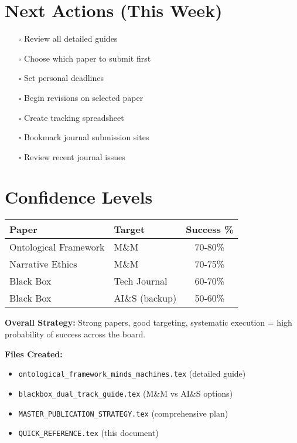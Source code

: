 \documentclass[12pt]{article}
\begin{document}
\section*{Next Actions (This Week)}

\begin{enumerate}[itemsep=0pt]
\item[$\square$] Review all detailed guides
\item[$\square$] Choose which paper to submit first
\item[$\square$] Set personal deadlines
\item[$\square$] Begin revisions on selected paper
\item[$\square$] Create tracking spreadsheet
\item[$\square$] Bookmark journal submission sites
\item[$\square$] Review recent journal issues
\end{enumerate}

\section*{Confidence Levels}

\begin{center}
\begin{tabular}{|l|l|c|}
\hline
\textbf{Paper} & \textbf{Target} & \textbf{Success \%} \\
\hline
Ontological Framework & M\&M & 70-80\% \\
Narrative Ethics & M\&M & 70-75\% \\
Black Box & Tech Journal & 60-70\% \\
Black Box & AI\&S (backup) & 50-60\% \\
\hline
\end{tabular}
\end{center}

\vspace{1em}
\noindent\textbf{Overall Strategy:} Strong papers, good targeting, systematic execution = high probability of success across the board.

\vspace{0.5em}
\noindent\textbf{Files Created:}
\begin{itemize}[itemsep=0pt]
\item \texttt{ontological\_framework\_minds\_machines.tex} (detailed guide)
\item \texttt{blackbox\_dual\_track\_guide.tex} (M\&M vs AI\&S options)
\item \texttt{MASTER\_PUBLICATION\_STRATEGY.tex} (comprehensive plan)
\item \texttt{QUICK\_REFERENCE.tex} (this document)
\end{itemize}
\end{document}
